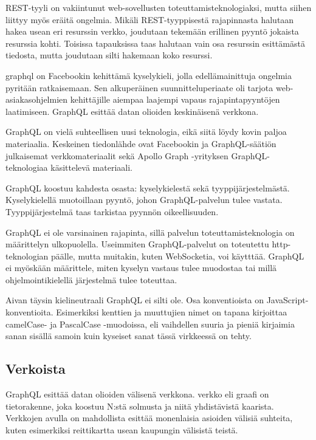 REST-tyyli on vakiintunut web-sovellusten toteuttamisteknologiaksi,
mutta siihen liittyy myös eräitä ongelmia. Mikäli REST-tyyppisestä
rajapinnasta halutaan hakea usean eri resurssin verkko, joudutaan
tekemään erillinen pyyntö jokaista resurssia kohti. Toisissa tapauksissa
taas halutaan vain osa resurssin esittämästä tiedosta, mutta joudutaan
silti hakemaan koko resurssi.
\cites{betterRESTPrisma}{WhyUseGraphQLApollo}

\gls{graphql} on Facebookin kehittämä kyselykieli, jolla
edellämainittuja ongelmia pyritään ratkaisemaan. Sen alkuperäinen
suunnitteluperiaate oli tarjota web-asiakasohjelmien kehittäjille
aiempaa laajempi vapaus rajapintapyyntöjen laatimiseen. GraphQL esittää
datan olioiden keskinäisenä verkkona. \citep{graphql:spec}

GraphQL on vielä suhteellisen uusi teknologia, eikä siitä löydy kovin
paljoa materiaalia. Keskeinen tiedonlähde ovat Facebookin
\cite{graphql:spec} ja GraphQL-säätiön \cite{GraphQLOrg} julkaisemat
verkkomateriaalit sekä Apollo Graph -yrityksen \cite{ApolloGraphQL}
GraphQL-teknologiaa käsittelevä materiaali.

GraphQL koostuu kahdesta osasta: kyselykielestä sekä
tyyppijärjestelmästä. Kyselykielellä muotoillaan pyyntö, johon
GraphQL-palvelun tulee vastata. Tyyppijärjestelmä taas tarkistaa pyynnön
oikeellisuuden.

GraphQL ei ole varsinainen rajapinta, sillä palvelun
toteuttamisteknologia on määrittelyn ulkopuolella. Useimmiten
GraphQL-palvelut on toteutettu \gls{http}-teknologian päälle, mutta
muitakin, kuten WebSocketia, voi käytttää. GraphQL ei myöskään
määrittele, miten kyselyn vastaus tulee muodostaa tai millä
ohjelmointikielellä järjestelmä tulee toteuttaa.

Aivan täysin kielineutraali GraphQL ei silti ole. Osa konventioista on
JavaScript-konventioita. Esimerkiksi kenttien ja muuttujien nimet on
tapana kirjoittaa camelCase- ja PascalCase -muodoissa, eli vaihdellen
suuria ja pieniä kirjaimia sanan sisällä samoin kuin kyseiset sanat
tässä virkkeessä on tehty. \citep{GraphQLSchemaBasics}

\hypertarget{verkoista}{%
\subsection{Verkoista}\label{verkoista}}

GraphQL esittää datan olioiden välisenä verkkona. \Gls{verkko} eli
graafi on tietorakenne, joka koostuu N:stä solmusta ja niitä
yhdistävistä kaarista. \cite{pozrikidis2014introduction} Verkkojen
avulla on mahdollista esittää monenlaisia asioiden välisiä suhteita,
kuten esimerkiksi reittikartta usean kaupungin välisistä teistä.

